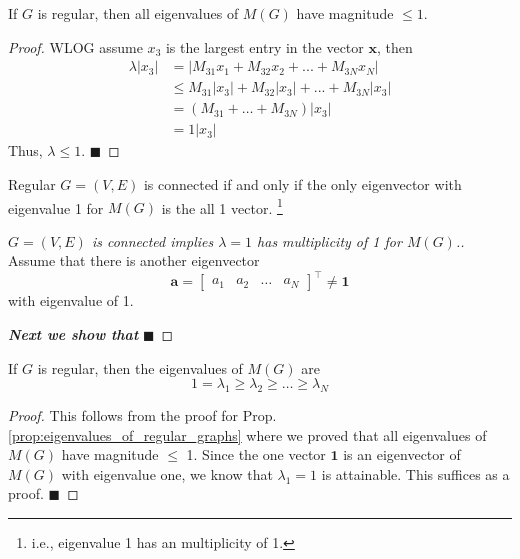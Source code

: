 \documentclass[11pt, letter]{book}
\newcommand{\ba}{\mathbf{a}}
\newcommand{\bx}{\mathbf{x}}
\newcommand{\qed}{\hfill $\blacksquare$}
\begin{document}
\begin{proposition}
	\label{prop:eigenvalues_of_regular_graphs}
	If $G$ is regular, then all eigenvalues of $M(G)$ have magnitude $\leq 1$. 
\end{proposition}

\begin{proof}
	WLOG assume $x_3$ is the largest entry in the vector $\bx$, then
	\begin{align}
		\lambda |x_3| 
		&= |M_{31}x_1 + M_{32}x_2 + ... + M_{3N}x_N| \\
		&\leq M_{31}|x_3| + M_{32}|x_3| + ... + M_{3N} |x_3| \\
		&= (M_{31} + \ldots + M_{3N}) |x_3| \\
		&= 1 |x_3|
	\end{align}
	Thus, $\lambda \leq 1$. \qed
\end{proof}

\begin{proposition}
	Regular $G = (V, E)$ is connected if and only if the only eigenvector with eigenvalue 1 for $M(G)$ is the all 1 vector. \footnote{i.e., eigenvalue 1 has an multiplicity of 1.}
\end{proposition}

\begin{proof} [$G = (V, E)$ is connected implies $\lambda = 1$ has multiplicity of 1 for $M(G)$.]
	Assume that there is another eigenvector 
	\begin{equation}
		\ba = \begin{bmatrix}
			a_1 & a_2 & \dots & a_N
		\end{bmatrix}^\top \neq \mathbf 1 
	\end{equation}
	with eigenvalue of 1. 
	
	
	\textit{\textbf{Next we show that }}
	\qed
\end{proof}

\begin{proposition}
	If $G$ is regular, then the eigenvalues of $M(G)$ are 
	\begin{equation}
		1 = \lambda_1 \geq \lambda_2 \geq \dots \geq \lambda_N
	\end{equation}
\end{proposition}

\begin{proof}
	This follows from the proof for Prop. \ref{prop:eigenvalues_of_regular_graphs} where we proved that all eigenvalues of $M(G)$ have magnitude $\leq$ 1. Since the one vector $\mathbf 1$ is an eigenvector of $M(G)$ with eigenvalue one, we know that $\lambda_1 = 1$ is attainable. This suffices as a proof. \qed
\end{proof}
\end{document}
